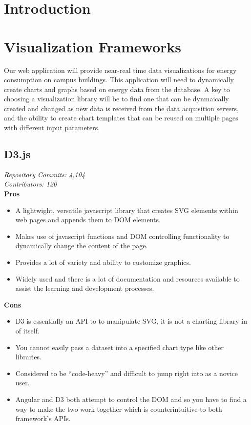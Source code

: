 \documentclass[onecolumn, draftclsnofoot,10pt, compsoc]{IEEEtran}
\begin{document}
\section{Introduction}

\section{Visualization Frameworks}
Our web application will provide near-real time data visualizations for energy consumption on campus buildings. This application will need to dynamically create charts and graphs based on energy data from the database. A key to choosing a visualization library will be to find one that can be dynmaically created and changed as new data is received from the data acquisition servers, and the ability to create chart templates that can be reused on multiple pages with different input parameters. 

\subsection{D3.js}
\textit{Repository Commits: 4,104}\\  
\textit{Contributors: 120}\\
\textbf{Pros}
\begin{itemize}
\item A lightwight, versatile javascript library that creates SVG elements within web pages and appends them to DOM elements. 
\item Makes use of javascript functions and DOM controlling functionality to dynamically change the content of the page. 
\item Provides a lot of variety and ability to customize graphics.
\item Widely used and there is a lot of documentation and resources available to assist the learning and development processes.
\end{itemize}
\textbf{Cons}
\begin{itemize}
\item D3 is essentially an API to to manipulate SVG, it is not a charting library in of itself.
\item You cannot easily pass a dataset into a specified chart type like other libraries.
\item Considered to be ``code-heavy'' and difficult to jump right into as a novice user.
\item Angular and D3 both attempt to control the DOM and so you have to find a way to make the two work together which is counterintuitive to both framework's APIs. 
\end{itemize}
\end{document}
